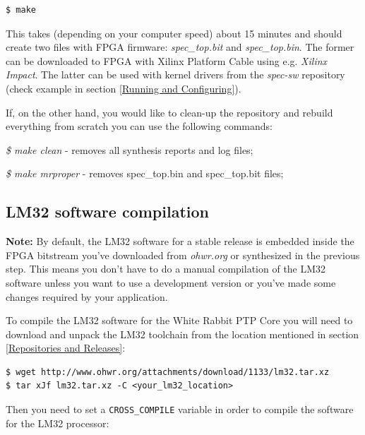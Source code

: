 \documentclass[a4paper, 12pt]{article}
\newcommand{\codeHook}[1]{\mbox{\ttfamily\MakeTextUppercase{#1}}}
\begin{document}
\begin{lstlisting}
$ make
\end{lstlisting}

This takes (depending on your computer speed) about 15 minutes and should create
two files with FPGA firmware: \textit{spec\_top.bit} and \textit{spec\_top.bin}. The
former can be downloaded to FPGA with Xilinx Platform Cable using e.g.
\textit{Xilinx Impact}. The latter can be used with kernel drivers from the
\textit{spec-sw} repository (check example in section \ref{Running and
Configuring}).

\vspace{1em}
If, on the other hand, you would like to clean-up the repository and rebuild
everything from scratch you can use the following commands:
\begin{itemize*}
\item \textit{\$ make clean} - removes all synthesis reports and log files;
\item \textit{\$ make mrproper} - removes spec\_top.bin and spec\_top.bit files;
\end{itemize*}

\subsection{LM32 software compilation}
\label{LM32 software compilation}

\textbf{Note:} By default, the \codeHook{lm32} software for a stable release is embedded
inside the FPGA bitstream you've downloaded from \textit{ohwr.org} or synthesized in
the previous step. This means you don't have to do a manual compilation of the
\codeHook{lm32} software unless you want to use a development version or you've made
some changes required by your application.

\vspace{1em}
To compile the \codeHook{lm32} software for the White Rabbit \codeHook{ptp} Core you will
need to download and unpack the \codeHook{lm32} toolchain from the location mentioned
in section \ref{Repositories and Releases}:

\begin{lstlisting}
$ wget http://www.ohwr.org/attachments/download/1133/lm32.tar.xz
$ tar xJf lm32.tar.xz -C <your_lm32_location>
\end{lstlisting}

Then you need to set a \texttt{CROSS\_COMPILE} variable in order
to compile the software for the \codeHook{lm32} processor:
\end{document}
